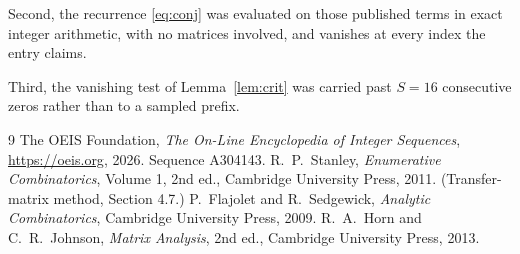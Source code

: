 \documentclass[11pt,a4paper]{article}
\theoremstyle{plain}
\theoremstyle{definition}
\begin{document}
Second, the recurrence \eqref{eq:conj} was evaluated on those published terms in exact
integer arithmetic, with no matrices involved, and vanishes at every index the entry claims.

Third, the vanishing test of Lemma~\ref{lem:crit} was carried past $S=16$ consecutive
zeros rather than to a sampled prefix.

\begin{thebibliography}{9}
 The OEIS Foundation, \emph{The On-Line Encyclopedia of Integer
Sequences}, \url{https://oeis.org}, 2026. Sequence A304143.
 R.~P.~Stanley, \emph{Enumerative Combinatorics}, Volume 1, 2nd ed.,
Cambridge University Press, 2011. (Transfer-matrix method, Section 4.7.)
 P.~Flajolet and R.~Sedgewick, \emph{Analytic Combinatorics}, Cambridge
University Press, 2009.
 R.~A.~Horn and C.~R.~Johnson, \emph{Matrix Analysis}, 2nd ed., Cambridge
University Press, 2013.
\end{thebibliography}
\end{document}
